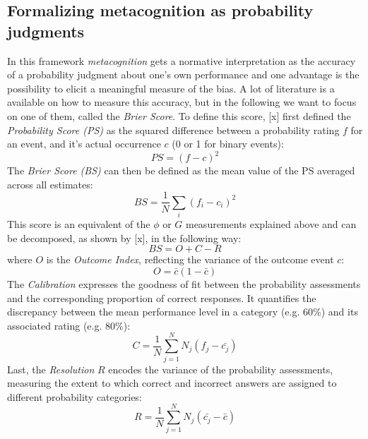 \documentclass[../main/main.tex]{subfiles}
\begin{document}
	\newpage
	\subsection{Formalizing metacognition as probability judgments}
	
	In this framework \textit{metacognition} gets a normative interpretation as the accuracy of a probability judgment about one's own performance and one advantage is the possibility to elicit a meaningful measure of the bias. A lot of literature is a available on how to measure this accuracy, but in the following we want to focus on one of them, called the \textit{Brier Score}. To define this score, [x] first defined the \textit{Probability Score (PS)} as the squared difference between a probability rating $f$ for an event, and it's actual occurrence $c$ (0 or 1 for binary events):
	\begin{displaymath}
			PS = (f - c)^2
	\end{displaymath}
	The \textit{Brier Score (BS)} can then be defined as the mean value of the PS averaged across all estimates:
	\begin{displaymath}
			BS = \frac{1}{N}\sum_i(f_i - c_i)^2
	\end{displaymath}
	This score is an equivalent of the $\phi$ or $G$ measurements explained above and can be decomposed, as shown by [x], in the following way:
	\begin{displaymath}
		BS = O + C - R
	\end{displaymath}
	where $O$ is the \textit{Outcome Index}, reflecting the variance of the outcome event $c$:
	\begin{displaymath}
		O = \bar{c}(1-\bar{c})
	\end{displaymath}
	The \textit{Calibration} expresses the goodness of fit between the probability assessments and the corresponding proportion of correct responses. It quantifies the discrepancy between the mean performance level in a category (e.g. $60\%$) and its associated rating (e.g. $80\%$):
	\begin{displaymath}
		C = \frac{1}{N}\sum_{j=1}^{N}N_j(f_j - \bar{c_j})
	\end{displaymath}
	Last, the \textit{Resolution} $R$ encodes the variance of the probability assessments, measuring the extent to which correct and incorrect answers are assigned to different probability categories:
	\begin{displaymath}
		R = \frac{1}{N}\sum_{j=1}^{N}N_j(\bar{c_j} - \bar{c})
	\end{displaymath}
\end{document}
